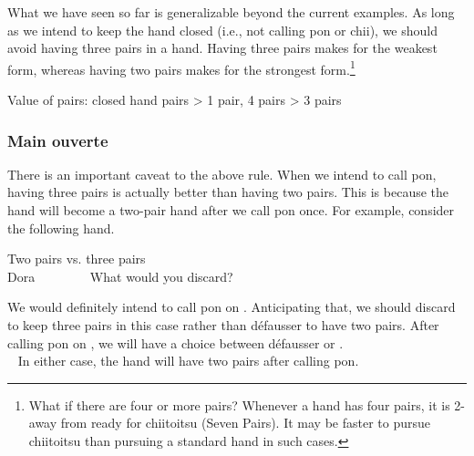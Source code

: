 {\bigskip
What we have seen so far is generalizable beyond the current examples. As long as we intend to keep the hand closed (i.e., not calling {\jap pon} or {\jap chii}), we should avoid having three pairs in a hand. Having three pairs makes for the weakest form, whereas having two pairs makes for the strongest form.\footnote{What if there are four or more pairs? Whenever a hand has four pairs, it is 2-away from ready for {\jap chiitoitsu} (Seven Pairs). It may be faster to pursue {\jap chiitoitsu} than pursuing a standard hand in such cases.}

\bigskip

\color{MyRed}
\begin{itembox}[c]{Value of pairs: closed hand}
\centering{} pairs > 1 pair, 4 pairs > 3 pairs
\end{itembox}\normalcolor

\bigskip

\subsubsection{Main ouverte}

There is an important caveat to the above rule. 
When we intend to call {\jap pon}, having three pairs is actually better than having two pairs. This is because the hand will become a two-pair hand after we call {\jap pon} once.
For example, consider the following hand. 
\begin{itembox}[r]{Two pairs vs. three pairs}
\bp
{}\zhong\zhong~\zhong\\
\hfill\footnotesize{{\jap Dora}~~~~~~~~}
\ep
\vspace{-17pt}What would you discard? \vspace{-5pt}
\end{itembox}
\noindent
We would definitely intend to call {\jap pon} on {\LARGE\zhong}. Anticipating that, we should discard {\LARGE{}} to keep three pairs in this case rather than défausser {\LARGE{}} to have two pairs. After calling {\jap pon} on {\LARGE\zhong}, we will have a choice between défausser  {\LARGE{}} or {\LARGE{}}.
\bp
{}~\zhong\rzhong\zhong\\
~\zhong\rzhong\zhong
\ep
In either case, the hand will have two pairs after calling {\jap pon}. 

}
